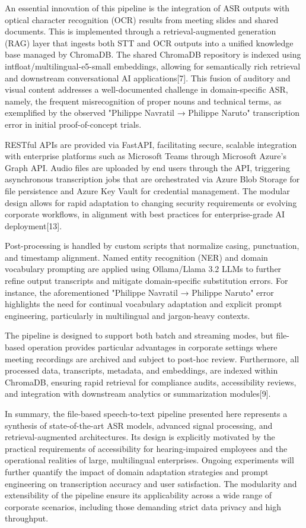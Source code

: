 \documentclass[12pt,a4paper]{article}
\begin{document}
An essential innovation of this pipeline is the integration of ASR outputs with optical character recognition (OCR) results from meeting slides and shared documents. This is implemented through a retrieval-augmented generation (RAG) layer that ingests both STT and OCR outputs into a unified knowledge base managed by ChromaDB. The shared ChromaDB repository is indexed using intfloat/multilingual-e5-small embeddings, allowing for semantically rich retrieval and downstream conversational AI applications[7]. This fusion of auditory and visual content addresses a well-documented challenge in domain-specific ASR, namely, the frequent misrecognition of proper nouns and technical terms, as exemplified by the observed "Philippe Navratil → Philippe Naruto" transcription error in initial proof-of-concept trials.


RESTful APIs are provided via FastAPI, facilitating secure, scalable integration with enterprise platforms such as Microsoft Teams through Microsoft Azure’s Graph API. Audio files are uploaded by end users through the API, triggering asynchronous transcription jobs that are orchestrated via Azure Blob Storage for file persistence and Azure Key Vault for credential management. The modular design allows for rapid adaptation to changing security requirements or evolving corporate workflows, in alignment with best practices for enterprise-grade AI deployment[13].


Post-processing is handled by custom scripts that normalize casing, punctuation, and timestamp alignment. Named entity recognition (NER) and domain vocabulary prompting are applied using Ollama/Llama 3.2 LLMs to further refine output transcripts and mitigate domain-specific substitution errors. For instance, the aforementioned "Philippe Navratil → Philippe Naruto" error highlights the need for continual vocabulary adaptation and explicit prompt engineering, particularly in multilingual and jargon-heavy contexts.


The pipeline is designed to support both batch and streaming modes, but file-based operation provides particular advantages in corporate settings where meeting recordings are archived and subject to post-hoc review. Furthermore, all processed data, transcripts, metadata, and embeddings, are indexed within ChromaDB, ensuring rapid retrieval for compliance audits, accessibility reviews, and integration with downstream analytics or summarization modules[9].


In summary, the file-based speech-to-text pipeline presented here represents a synthesis of state-of-the-art ASR models, advanced signal processing, and retrieval-augmented architectures. Its design is explicitly motivated by the practical requirements of accessibility for hearing-impaired employees and the operational realities of large, multilingual enterprises. Ongoing experiments will further quantify the impact of domain adaptation strategies and prompt engineering on transcription accuracy and user satisfaction. The modularity and extensibility of the pipeline ensure its applicability across a wide range of corporate scenarios, including those demanding strict data privacy and high throughput.
\end{document}
